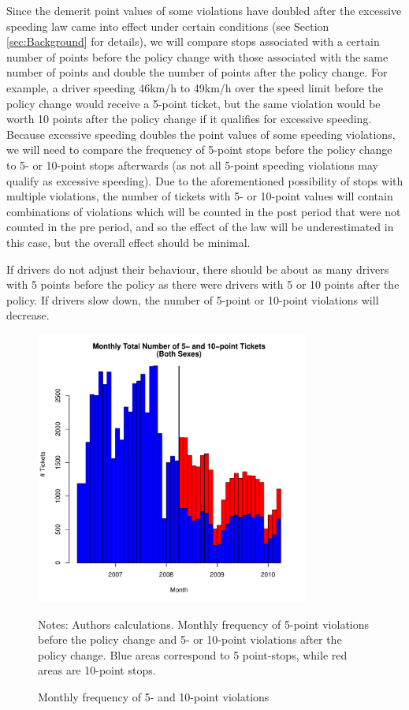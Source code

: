 Since the demerit point values of some violations have doubled 
after the excessive speeding law came into effect 
under certain conditions (see Section \ref{sec:Background} for details), 
we will compare stops associated with a certain number of points 
before the policy change with those associated with the 
same number of points and double the number of points after the policy change. 
For example, a driver speeding 46km/h to 49km/h over the speed limit 
before the policy change would receive a 5-point ticket, 
but the same violation would be worth 10 points after the policy change 
if it qualifies for excessive speeding. 
Because excessive speeding doubles the point values of some speeding violations, 
we will need to compare the frequency of 5-point stops before the policy change 
to 5- or 10-point stops afterwards 
(as not all 5-point speeding violations may qualify as excessive speeding). 
Due to the aforementioned possibility of stops with multiple violations, 
the number of tickets with 5- or 10-point values will contain 
combinations of violations which will be counted in the post period 
that were not counted in the pre period, and so the effect of the law 
will be underestimated in this case, but the overall effect should be minimal.

If drivers do not adjust their behaviour, 
there should be about as many drivers with 5 points before the policy 
as there were drivers with 5 or 10 points after the policy. 
If drivers slow down, the number of 5-point or 10-point violations will decrease. %



\begin{figure}
\centering
\includegraphics[width=0.8\textwidth]{../Figures/num_pts_5_10_all_orig.pdf}
\caption{Monthly frequency of 5- and 10-point violations }
Notes: Authors calculations. 
Monthly frequency of 5-point violations before the policy change 
and 5- or 10-point violations after the policy change. 
Blue areas correspond to 5 point-stops, while red areas are 10-point stops.
\label{fig:num_pts_5_10_all}
\end{figure}


